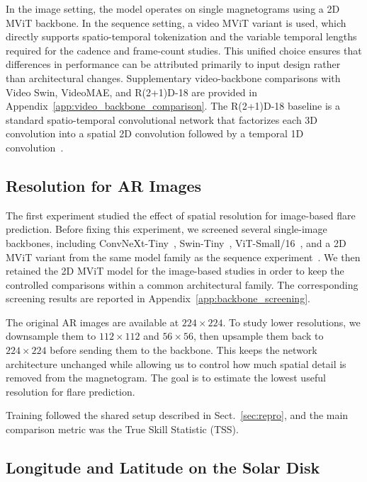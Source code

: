 In the image setting, the model operates on single magnetograms using a 2D MViT backbone. In the sequence setting, a video MViT variant is used, which directly supports spatio-temporal tokenization and the variable temporal lengths required for the cadence and frame-count studies. This unified choice ensures that differences in performance can be attributed primarily to input design rather than architectural changes. Supplementary video-backbone comparisons with Video Swin, VideoMAE, and R(2+1)D-18 are provided in Appendix~\ref{app:video_backbone_comparison}. The R(2+1)D-18 baseline is a standard spatio-temporal convolutional network that factorizes each 3D convolution into a spatial 2D convolution followed by a temporal 1D convolution~\cite{ref_r2plus1d}.

\subsection{Resolution for AR Images}

The first experiment studied the effect of spatial resolution for image-based flare prediction. Before fixing this experiment, we screened several single-image backbones, including ConvNeXt-Tiny~\cite{ref_convnext}, Swin-Tiny~\cite{ref_swin}, ViT-Small/16~\cite{ref_vit}, and a 2D MViT variant from the same model family as the sequence experiment~\cite{ref_mvit}. We then retained the 2D MViT model for the image-based studies in order to keep the controlled comparisons within a common architectural family. The corresponding screening results are reported in Appendix~\ref{app:backbone_screening}.

The original AR images are available at $224 \times 224$. To study lower resolutions, we downsample them to $112 \times 112$ and $56 \times 56$, then upsample them back to $224 \times 224$ before sending them to the backbone. This keeps the network architecture unchanged while allowing us to control how much spatial detail is removed from the magnetogram. The goal is to estimate the lowest useful resolution for flare prediction.

Training followed the shared setup described in Sect.~\ref{sec:repro}, and the main comparison metric was the True Skill Statistic (TSS).

\subsection{Longitude and Latitude on the Solar Disk}
\label{sec:longitude_latitude_disk}

